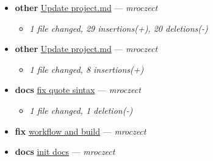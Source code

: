 \begin{itemize}[leftmargin=1.5em]
  \item \textbf{other} \href{https://github.com/mroczect/mroczect.github.io/commit/7a3e8beeb8e3c35f2be1dd93e7ca714342fc1777}{Update project.md} --- \textit{mroczect}
  \begin{itemize}[leftmargin=1.5em]
    \item \small\textit{1 file changed, 29 insertions(+), 20 deletions(-)}
  \end{itemize}
  \item \textbf{other} \href{https://github.com/mroczect/mroczect.github.io/commit/e3001ba935840f1f9266bdd1187ef6abac254c57}{Update project.md} --- \textit{mroczect}
  \begin{itemize}[leftmargin=1.5em]
    \item \small\textit{1 file changed, 8 insertions(+)}
  \end{itemize}
  \item \textbf{docs} \href{https://github.com/mroczect/mroczect.github.io/commit/433ae7b810f12fee4b2aa177e4ca0e1a87effe8b}{fix quote sintax} --- \textit{mroczect}
  \begin{itemize}[leftmargin=1.5em]
    \item \small\textit{1 file changed, 1 deletion(-)}
  \end{itemize}
  \item \textbf{fix} \href{https://github.com/mroczect/mroczect.github.io/commit/d48058e1cc414eb6c02d43bb59e81862acf0bbef}{workflow and build} --- \textit{mroczect}
  \item \textbf{docs} \href{https://github.com/mroczect/mroczect.github.io/commit/4078a6b9a3e439d80de4d4452d77df154902d249}{init docs} --- \textit{mroczect}
\end{itemize}

